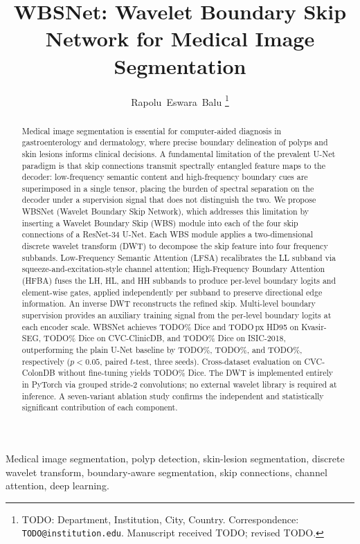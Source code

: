 \documentclass[journal]{IEEEtran}
\title{WBSNet: Wavelet Boundary Skip Network for Medical Image Segmentation}
\author{Rapolu~Eswara~Balu%
  \thanks{TODO: Department, Institution, City, Country.
    Correspondence: \texttt{TODO@institution.edu}.
    Manuscript received TODO; revised TODO.}%
}
\begin{document}
\maketitle

\begin{abstract}
Medical image segmentation is essential for computer-aided diagnosis in
gastroenterology and dermatology, where precise boundary delineation of polyps
and skin lesions informs clinical decisions.
A fundamental limitation of the prevalent U-Net paradigm is that skip
connections transmit spectrally entangled feature maps to the decoder:
low-frequency semantic content and high-frequency boundary cues are
superimposed in a single tensor, placing the burden of spectral separation on
the decoder under a supervision signal that does not distinguish the two.
We propose WBSNet (Wavelet Boundary Skip Network), which addresses this
limitation by inserting a Wavelet Boundary Skip (WBS) module into each of the
four skip connections of a ResNet-34 U-Net.
Each WBS module applies a two-dimensional discrete wavelet transform (DWT) to
decompose the skip feature into four frequency subbands.
Low-Frequency Semantic Attention (LFSA) recalibrates the LL subband via
squeeze-and-excitation-style channel attention; High-Frequency Boundary
Attention (HFBA) fuses the LH, HL, and HH subbands to produce per-level
boundary logits and element-wise gates, applied independently per subband to
preserve directional edge information.
An inverse DWT reconstructs the refined skip.
Multi-level boundary supervision provides an auxiliary training signal from
the per-level boundary logits at each encoder scale.
WBSNet achieves TODO\% Dice and TODO\,px HD95 on Kvasir-SEG, TODO\% Dice on
CVC-ClinicDB, and TODO\% Dice on ISIC-2018, outperforming the plain U-Net
baseline by TODO\%, TODO\%, and TODO\%, respectively ($p < 0.05$, paired
$t$-test, three seeds).
Cross-dataset evaluation on CVC-ColonDB without fine-tuning yields
TODO\% Dice.
The DWT is implemented entirely in PyTorch via grouped stride-2 convolutions;
no external wavelet library is required at inference.
A seven-variant ablation study confirms the independent and statistically
significant contribution of each component.
\end{abstract}

\begin{IEEEkeywords}
Medical image segmentation, polyp detection, skin-lesion segmentation,
discrete wavelet transform, boundary-aware segmentation, skip connections,
channel attention, deep learning.
\end{IEEEkeywords}
\end{document}
